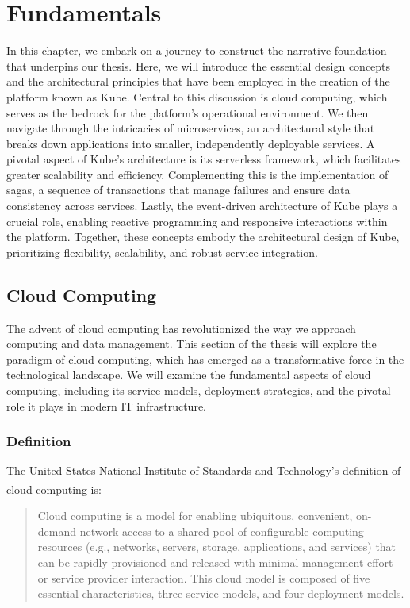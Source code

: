 \chapter{Fundamentals}
In this chapter, we embark on a journey to construct the narrative foundation that underpins our
thesis. Here, we will introduce the essential design concepts and the architectural principles that
have been employed in the creation of the platform known as Kube. Central to this discussion is
cloud computing, which serves as the bedrock for the platform's operational environment. We then
navigate through the intricacies of microservices, an architectural style that breaks down
applications into smaller, independently deployable services. A pivotal aspect of Kube's
architecture is its serverless framework, which facilitates greater scalability and efficiency.
Complementing this is the implementation of sagas, a sequence of transactions that manage failures
and ensure data consistency across services. Lastly, the event-driven architecture of Kube plays a
crucial role, enabling reactive programming and responsive interactions within the platform.
Together, these concepts embody the architectural design of Kube, prioritizing flexibility,
scalability, and robust service integration.

\section{Cloud Computing}
The advent of cloud computing has revolutionized the way we approach computing and data management.
This section of the thesis will explore the paradigm of cloud computing, which has emerged as a
transformative force in the technological landscape. We will examine the fundamental aspects of
cloud computing, including its service models, deployment strategies, and the pivotal role it plays
in modern IT infrastructure.

\subsection{Definition}
The United States National Institute of Standards and Technology's definition of cloud computing
is\textsuperscript{\cite{nist}}:

\begin{quote}
    Cloud computing is a model for enabling ubiquitous, convenient, on-demand network access to a
    shared pool of configurable computing resources (e.g., networks, servers, storage, applications, and
    services) that can be rapidly provisioned and released with minimal management effort or service
    provider interaction. This cloud model is composed of five essential characteristics, three service
    models, and four deployment models.
\end{quote}

